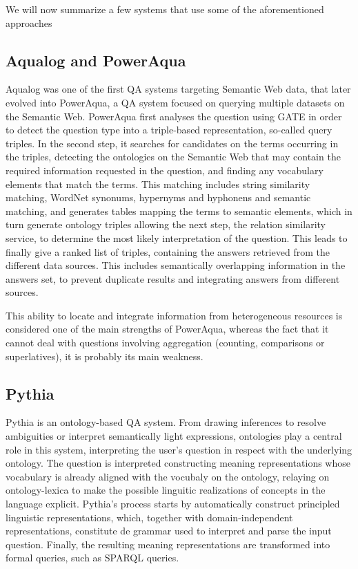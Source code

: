 We will now summarize a few systems that use some of the aforementioned approaches

\subsection{Aqualog and PowerAqua}

Aqualog was one of the first \ac{QA} systems targeting Semantic Web data, that later evolved into PowerAqua, a \ac{QA} system focused on querying multiple datasets on the Semantic Web. PowerAqua first analyses the question using GATE in order to detect the question type into a triple-based representation, so-called query triples. In the second step, it searches for candidates on the terms occurring in the triples, detecting the ontologies on the Semantic Web that may contain the required information requested in the question, and finding any vocabulary elements that match the terms. This matching includes string similarity matching, WordNet synonums, hypernyms and hyphonens and semantic matching, and generates tables mapping the terms to semantic elements, which in turn generate ontology triples allowing the next step, the relation similarity service, to determine the most likely interpretation of the question. This leads to finally give a ranked list of triples, containing the answers retrieved from the different data sources. This includes semantically overlapping information in the answers set, to prevent duplicate results and integrating answers from different sources.

This ability to locate and integrate information from heterogeneous resources is considered one of the main strengths of PowerAqua, whereas the fact that it cannot deal with questions involving aggregation (counting, comparisons or superlatives), it is probably its main weakness.

\subsection{Pythia}

Pythia is an ontology-based \ac{QA} system. From drawing inferences to resolve ambiguities or interpret semantically light expressions, ontologies play a central role in this system, interpreting the user's question in respect with the underlying ontology. The question is interpreted constructing meaning representations whose vocabulary is already aligned with the vocubaly on the ontology, relaying on ontology-lexica to make the possible linguitic realizations of concepts in the language explicit. Pythia's process starts by automatically construct principled linguistic representations, which, together with domain-independent representations, constitute de grammar used to interpret and parse the input question. Finally, the resulting meaning representations are transformed into formal queries, such as SPARQL queries.

